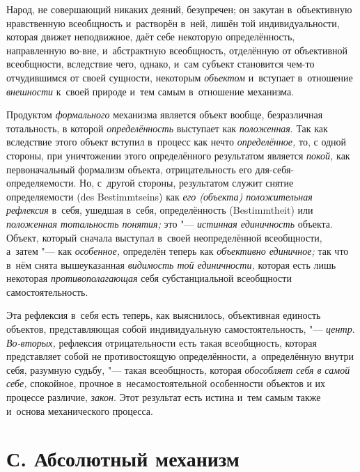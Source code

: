 Народ, не совершающий никаких деяний, безупречен; он закутан
в~объективную нравственную всеобщность и~растворён в~ней, лишён той
индивидуальности, которая движет неподвижное, даёт себе некоторую
определённость, направленную во-вне, и~абстрактную всеобщность, отделённую
от объективной всеобщности, вследствие чего, однако, и~сам субъект
становится чем-то отчудившимся от своей сущности, некоторым
{\em объектом} и~вступает
в~отношение {\em внешности}
к~своей природе и~тем самым в~отношение механизма.


Продуктом
{\em формального}
механизма является объект вообще, безразличная тотальность, в
которой {\em определённость}
выступает как
{\em положенная}. Так как
вследствие этого объект вступил в~процесс как нечто
{\em определённое,} то, с
одной стороны, при уничтожении этого определённого результатом является
{\em покой,} как
первоначальный формализм объекта, отрицательность его
для-себя-определяемости. Но, с~другой стороны,
результатом служит
снятие
определяемости (des Bestimmt\-seins) как
{\em его (объекта) положительная
рефлексия} в~себя, ушедшая в~себя, определённость
(Bestimmt\-heit) или {\em положенная
тотальность понятия;} это
"--- {\em истинная единичность
}объекта. Объект, который сначала выступал в~своей
неопределённой всеобщности, а~затем "--- как
{\em особенное,}
определён теперь как
{\em объективно единичное;}
так что в~нём снята вышеуказанная
{\em видимость той единичности,}
которая есть лишь некоторая
{\em противополагающая}
себя субстанциальной всеобщности самостоятельность.

Эта рефлексия в~себя есть теперь, как выяснилось, объективная
единость объектов, представляющая собой индивидуальную самостоятельность,
"--- {\em центр}.
{\em Во-вторых,}
рефлексия отрицательности есть такая всеобщность, которая
представляет собой не противостоящую определённости, а~определённую внутри
себя, разумную судьбу, "--- такая всеобщность, которая
{\em обособляет себя в
}{\em самой себе,}
спокойное, прочное в~несамостоятельной особенности объектов и
их процессе различие, {\em закон}.
Этот результат есть истина и~тем самым также и~основа
механического процесса.

\section[С. Абсолютный механизм]{С. Абсолютный механизм}

